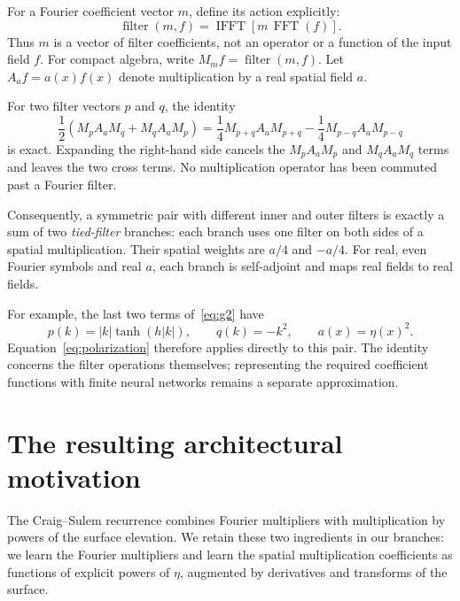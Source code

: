 \documentclass[11pt,letterpaper]{article}
\DeclareMathOperator{\FFT}{FFT}
\DeclareMathOperator{\IFFT}{IFFT}
\DeclareMathOperator{\filter}{filter}
\begin{document}
For a Fourier coefficient vector $m$, define its action explicitly:
\begin{equation}
  \filter(m,f)=\IFFT\!\left[m\,\FFT(f)\right].
  \label{eq:filter}
\end{equation}
Thus $m$ is a vector of filter coefficients, not an operator or a function of
the input field $f$. For compact algebra, write $M_m f=\filter(m,f)$.
Let $A_a f=a(x)f(x)$ denote multiplication by a real spatial field $a$.

For two filter vectors $p$ and $q$, the identity
\begin{equation}
  \boxed{
  \frac12\left(M_p A_a M_q+M_q A_a M_p\right)
  =\frac14 M_{p+q} A_a M_{p+q}
   -\frac14 M_{p-q} A_a M_{p-q}}
  \label{eq:polarization}
\end{equation}
is exact. Expanding the right-hand side cancels the $M_p A_a M_p$ and
$M_q A_a M_q$ terms and leaves the two cross terms. No multiplication
operator has been commuted past a Fourier filter.

Consequently, a symmetric pair with different inner and outer filters is
exactly a sum of two \emph{tied-filter} branches: each branch uses one filter
on both sides of a spatial multiplication. Their spatial weights are $a/4$
and $-a/4$. For real, even Fourier symbols and real $a$, each branch is
self-adjoint and maps real fields to real fields.

For example, the last two terms of~\eqref{eq:g2} have
\begin{equation}
  p(k)=|k|\tanh(h|k|),\qquad q(k)=-k^2,\qquad a(x)=\eta(x)^2.
\end{equation}
Equation~\eqref{eq:polarization} therefore applies directly to this pair.
The identity concerns the filter operations themselves; representing the
required coefficient functions with finite neural networks remains a
separate approximation.

\clearpage
\section{The resulting architectural motivation}

The Craig--Sulem recurrence combines Fourier multipliers with multiplication
by powers of the surface elevation. We retain these two ingredients in our
branches: we learn the Fourier multipliers and learn the spatial
multiplication coefficients as functions of explicit powers of $\eta$,
augmented by derivatives and transforms of the surface.
\end{document}
